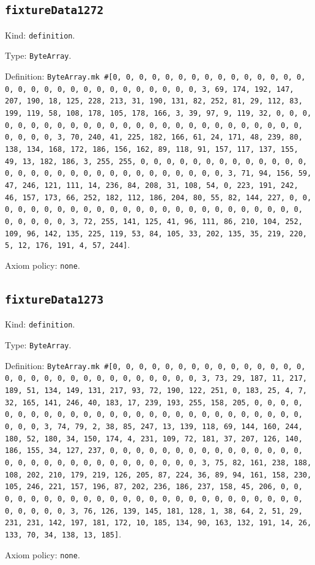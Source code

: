 \documentclass[11pt]{article}
\begin{document}
\subsection*{\texttt{fixtureData1272}}
\noindent Kind: \texttt{definition}.\par
\noindent Type: \texttt{ByteArray}.\par
\noindent Definition: \texttt{ByteArray.mk \#[0, 0, 0, 0, 0, 0, 0, 0, 0, 0, 0, 0, 0, 0, 0, 0, 0, 0, 0, 0, 0, 0, 0, 0, 0, 0, 0, 0, 0, 0, 3, 69, 174, 192, 147, 207, 190, 18, 125, 228, 213, 31, 190, 131, 82, 252, 81, 29, 112, 83, 199, 119, 58, 108, 178, 105, 178, 166, 3, 39, 97, 9, 119, 32, 0, 0, 0, 0, 0, 0, 0, 0, 0, 0, 0, 0, 0, 0, 0, 0, 0, 0, 0, 0, 0, 0, 0, 0, 0, 0, 0, 0, 0, 0, 3, 70, 240, 41, 225, 182, 166, 61, 24, 171, 48, 239, 80, 138, 134, 168, 172, 186, 156, 162, 89, 118, 91, 157, 117, 137, 155, 49, 13, 182, 186, 3, 255, 255, 0, 0, 0, 0, 0, 0, 0, 0, 0, 0, 0, 0, 0, 0, 0, 0, 0, 0, 0, 0, 0, 0, 0, 0, 0, 0, 0, 0, 0, 0, 3, 71, 94, 156, 59, 47, 246, 121, 111, 14, 236, 84, 208, 31, 108, 54, 0, 223, 191, 242, 46, 157, 173, 66, 252, 182, 112, 186, 204, 80, 55, 82, 144, 227, 0, 0, 0, 0, 0, 0, 0, 0, 0, 0, 0, 0, 0, 0, 0, 0, 0, 0, 0, 0, 0, 0, 0, 0, 0, 0, 0, 0, 0, 0, 3, 72, 255, 141, 125, 41, 96, 111, 86, 210, 104, 252, 109, 96, 142, 135, 225, 119, 53, 84, 105, 33, 202, 135, 35, 219, 220, 5, 12, 176, 191, 4, 57, 244]}.\par
\noindent Axiom policy: \texttt{none}.\par
\subsection*{\texttt{fixtureData1273}}
\noindent Kind: \texttt{definition}.\par
\noindent Type: \texttt{ByteArray}.\par
\noindent Definition: \texttt{ByteArray.mk \#[0, 0, 0, 0, 0, 0, 0, 0, 0, 0, 0, 0, 0, 0, 0, 0, 0, 0, 0, 0, 0, 0, 0, 0, 0, 0, 0, 0, 0, 0, 3, 73, 29, 187, 11, 217, 189, 51, 134, 149, 131, 217, 93, 72, 190, 122, 251, 0, 183, 25, 4, 7, 32, 165, 141, 246, 40, 183, 17, 239, 193, 255, 158, 205, 0, 0, 0, 0, 0, 0, 0, 0, 0, 0, 0, 0, 0, 0, 0, 0, 0, 0, 0, 0, 0, 0, 0, 0, 0, 0, 0, 0, 0, 0, 3, 74, 79, 2, 38, 85, 247, 13, 139, 118, 69, 144, 160, 244, 180, 52, 180, 34, 150, 174, 4, 231, 109, 72, 181, 37, 207, 126, 140, 186, 155, 34, 127, 237, 0, 0, 0, 0, 0, 0, 0, 0, 0, 0, 0, 0, 0, 0, 0, 0, 0, 0, 0, 0, 0, 0, 0, 0, 0, 0, 0, 0, 0, 0, 3, 75, 82, 161, 238, 188, 108, 202, 210, 179, 219, 126, 205, 87, 224, 36, 89, 94, 161, 158, 230, 105, 246, 221, 157, 196, 87, 202, 236, 186, 237, 158, 45, 206, 0, 0, 0, 0, 0, 0, 0, 0, 0, 0, 0, 0, 0, 0, 0, 0, 0, 0, 0, 0, 0, 0, 0, 0, 0, 0, 0, 0, 0, 0, 3, 76, 126, 139, 145, 181, 128, 1, 38, 64, 2, 51, 29, 231, 231, 142, 197, 181, 172, 10, 185, 134, 90, 163, 132, 191, 14, 26, 133, 70, 34, 138, 13, 185]}.\par
\noindent Axiom policy: \texttt{none}.\par
\end{document}
